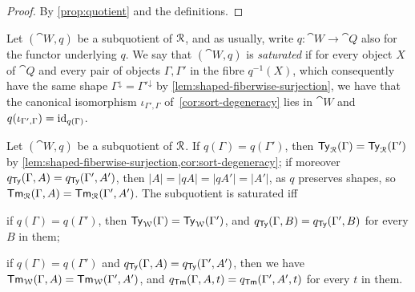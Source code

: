 \begin{proof}
    By \cref{prop:quotient} and the definitions.
\end{proof}

\begin{definition}\label{def:saturated}
    Let $(\cat{W}, q)$ be a subquotient of $\mathcal{R}$, and as usually, write $q : \cat{W} \to \cat{Q}$ also for the functor underlying $q$. We say that $(\cat{W}, q)$ is \emph{saturated} if for every object $X$ of $\cat{Q}$ and every pair of objects $\Gamma, \Gamma'$ in the fibre $q^{-1}(X)$, which consequently have the same shape $\Gamma^{\downarrow} = \Gamma'^{\downarrow}$ by \cref{lem:shaped-fiberwise-surjection}, we have that the canonical isomorphism $\iota_{\Gamma', \Gamma}$ of~\cref{cor:sort-degeneracy} lies in $\cat{W}$ and $q(\iota_{\Gamma', \Gamma}) = \mathrm{id}_{q(\Gamma)}$.
\end{definition}

\begin{lemma}\label{lem:saturated}
    Let $(\cat{W}, q)$ be a subquotient of $\mathcal{R}$. If $q(\Gamma) = q(\Gamma')$, then $\mathsf{Ty}_{\mathcal{R}}(\Gamma) = \mathsf{Ty}_{\mathcal{R}}(\Gamma')$ by \cref{lem:shaped-fiberwise-surjection,cor:sort-degeneracy}; if moreover $q_{\mathsf{Ty}}(\Gamma, A) = q_{\mathsf{Ty}}(\Gamma', A')$, then $|A| = |qA| = |qA'| = |A'|$, as $q$ preserves shapes, so $\mathsf{Tm}_{\mathcal{R}}(\Gamma, A) = \mathsf{Tm}_{\mathcal{R}}(\Gamma', A')$. The subquotient is saturated iff
    \begin{description}[font=\normalfont, leftmargin=!, labelwidth=3em]
        \item[(S1)] if $q(\Gamma) = q(\Gamma')$, then $\mathsf{Ty}_{\mathcal{W}}(\Gamma) = \mathsf{Ty}_{\mathcal{W}}(\Gamma')$, and $q_{\mathsf{Ty}}(\Gamma, B) = q_{\mathsf{Ty}}(\Gamma', B)$ for every $B$ in them;
        \item[(S2)] if $q(\Gamma) = q(\Gamma')$ and $q_{\mathsf{Ty}}(\Gamma, A) = q_{\mathsf{Ty}}(\Gamma', A')$, then we have $\mathsf{Tm}_{\mathcal{W}}(\Gamma, A) = \mathsf{Tm}_{\mathcal{W}}(\Gamma', A')$, and $q_{\mathsf{Tm}}(\Gamma, A, t) = q_{\mathsf{Tm}}(\Gamma', A', t)$ for every $t$ in them.
    \end{description}
\end{lemma}

